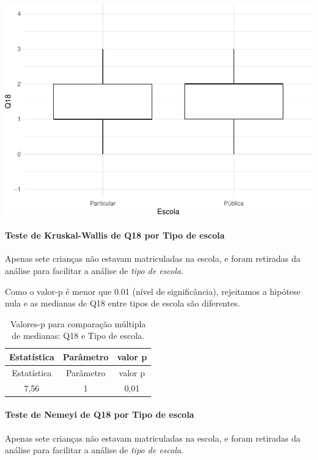 \documentclass[]{article}
\let\oldparagraph\paragraph
\renewcommand{\paragraph}[1]{\oldparagraph{#1}\mbox{}}
\begin{document}
\begin{center}\includegraphics[width=0.75\linewidth]{relatorio_covid19_files/figure-latex/unnamed-chunk-293-1} \end{center}

\hypertarget{teste-de-kruskal-wallis-de-q18-por-tipo-de-escola}{%
\paragraph{Teste de Kruskal-Wallis de Q18 por Tipo de escola}\label{teste-de-kruskal-wallis-de-q18-por-tipo-de-escola}}

Apenas sete crianças não estavam matriculadas na escola, e foram retiradas da análise para facilitar a análise de \emph{tipo de escola}.

Como o valor-p é menor que 0.01 (nível de significância), rejeitamos a hipótese nula e as medianas de Q18 entre tipos de escola são diferentes.

\begin{longtable}[]{@{}ccc@{}}
\caption{\label{tab:unnamed-chunk-295}Valores-p para comparação múltipla de medianas: Q18 e Tipo de escola.}\tabularnewline
\toprule
Estatística & Parâmetro & valor p\tabularnewline
\midrule
\endfirsthead
\toprule
Estatística & Parâmetro & valor p\tabularnewline
\midrule
\endhead
7,56 & 1 & 0,01\tabularnewline
\bottomrule
\end{longtable}

\hypertarget{teste-de-nemeyi-de-q18-por-tipo-de-escola}{%
\paragraph{Teste de Nemeyi de Q18 por Tipo de escola}\label{teste-de-nemeyi-de-q18-por-tipo-de-escola}}

Apenas sete crianças não estavam matriculadas na escola, e foram retiradas da análise para facilitar a análise de \emph{tipo de escola}.
\end{document}
